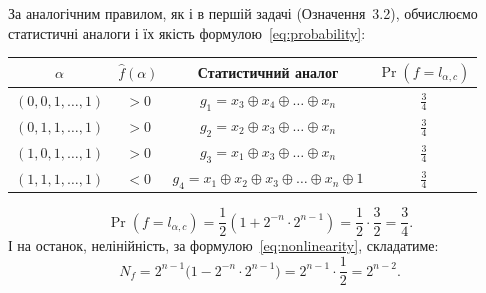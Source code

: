 За аналогічним правилом, як і в першій задачі (Означення~3.2), обчислюємо статистичні аналоги і їх якість формулою~\eqref{eq:probability}:
\begin{center}
    \renewcommand{\arraystretch}{1.3}
    \begin{tabular}{c|c|c|c}
        $\alpha$           & $\hat{f}(\alpha)$ & Статистичний аналог                                                 & $\Pr(f = l_{\alpha,c})$ \\
        \hline
        $(0,0,1,\ldots,1)$ & $> 0$             & $g_1 = x_3 \oplus x_4 \oplus \ldots \oplus x_n$                     & $\frac{3}{4}$           \\
        $(0,1,1,\ldots,1)$ & $> 0$             & $g_2 = x_2 \oplus x_3 \oplus \ldots \oplus x_n$                     & $\frac{3}{4}$           \\
        $(1,0,1,\ldots,1)$ & $> 0$             & $g_3 = x_1 \oplus x_3 \oplus \ldots \oplus x_n$                     & $\frac{3}{4}$           \\
        $(1,1,1,\ldots,1)$ & $< 0$             & $g_4 = x_1 \oplus x_2 \oplus x_3 \oplus \ldots \oplus x_n \oplus 1$ & $\frac{3}{4}$           \\
    \end{tabular}
\end{center}
\begin{equation*}
    \Pr(f = l_{\alpha,c}) = \frac{1}{2}\left(1 + 2^{-n} \cdot 2^{n-1}\right) = \frac{1}{2}\cdot\frac{3}{2} = \frac{3}{4}.
\end{equation*}
І на останок, нелінійність, за формулою~\eqref{eq:nonlinearity}, складатиме:
\begin{equation*}
    N_f = 2^{n-1}\big(1 - 2^{-n} \cdot 2^{n-1}\big) = 2^{n-1}\cdot\frac{1}{2} = 2^{n-2}.
\end{equation*}
